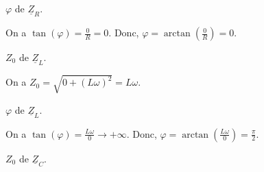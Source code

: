 
\begin{enonce}
	$\varphi$ de $\underline{Z}_R$.
\end{enonce}


\begin{corrige}
On a $\tan (\varphi) = \frac{0}{R} = 0$. Donc, $\varphi = \arctan \left(  \frac{0}{R} \right) = 0$.
\end{corrige}



\begin{enonce}
	$Z_0$ de $\underline{Z}_L$.
\end{enonce}


\begin{corrige}
On a $Z_0 = \sqrt{0 + \left(L\omega\right)^2} = L\omega$.
\end{corrige}



\begin{enonce}
	$\varphi$ de $\underline{Z}_L$.
\end{enonce}


\begin{corrige}
On a $\tan (\varphi) = \frac{L\omega}{0} \rightarrow +\infty$. Donc, $\varphi = \arctan \left(  \frac{L\omega}{0} \right) = \frac{\pi}{2}$.
\end{corrige}



\begin{enonce}
	$Z_0$ de $\underline{Z}_C$.
\end{enonce}


